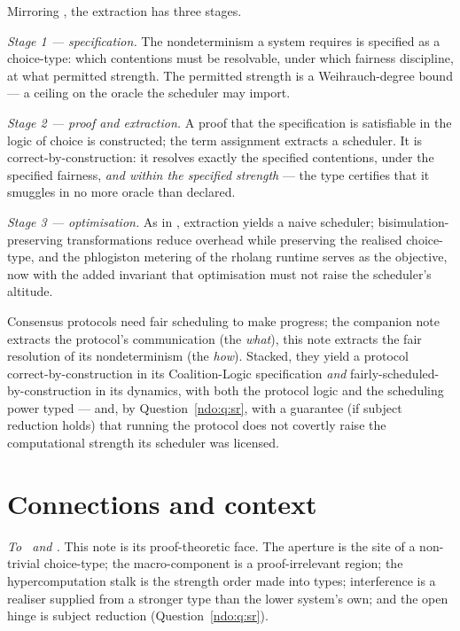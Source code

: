 Mirroring \cite{consensus}, the extraction has three stages.

\emph{Stage 1 --- specification.} The nondeterminism a system requires is specified as a choice-type: which
contentions must be resolvable, under which fairness discipline, at what permitted strength. The permitted
strength is a Weihrauch-degree bound --- a ceiling on the oracle the scheduler may import.

\emph{Stage 2 --- proof and extraction.} A proof that the specification is satisfiable in the logic of choice is
constructed; the term assignment extracts a scheduler. It is correct-by-construction: it resolves exactly the
specified contentions, under the specified fairness, \emph{and within the specified strength} --- the type
certifies that it smuggles in no more oracle than declared.

\emph{Stage 3 --- optimisation.} As in \cite{consensus}, extraction yields a naive scheduler; bisimulation-preserving
transformations reduce overhead while preserving the realised choice-type, and the phlogiston metering of the
rholang runtime serves as the objective, now with the added invariant that optimisation must not raise the
scheduler's altitude.

\begin{remark}
Consensus protocols need fair scheduling to make progress; the companion note extracts the protocol's
communication (the \emph{what}), this note extracts the fair resolution of its nondeterminism (the \emph{how}).
Stacked, they yield a protocol correct-by-construction in its Coalition-Logic specification \emph{and}
fairly-scheduled-by-construction in its dynamics, with both the protocol logic and the scheduling power typed ---
and, by Question~\ref{ndo:q:sr}, with a guarantee (if subject reduction holds) that running the protocol does not
covertly raise the computational strength its scheduler was licensed.
\end{remark}

\section{Connections and context}\label{chs:sec:conn}

\emph{To \chApr\ and \chAgy.} This note is its proof-theoretic face. The aperture is the site of a
non-trivial choice-type; the macro-component is a proof-irrelevant region; the hypercomputation stalk is the
strength order made into types; interference is a realiser supplied from a stronger type than the lower system's
own; and the open hinge is subject reduction (Question~\ref{ndo:q:sr}).

